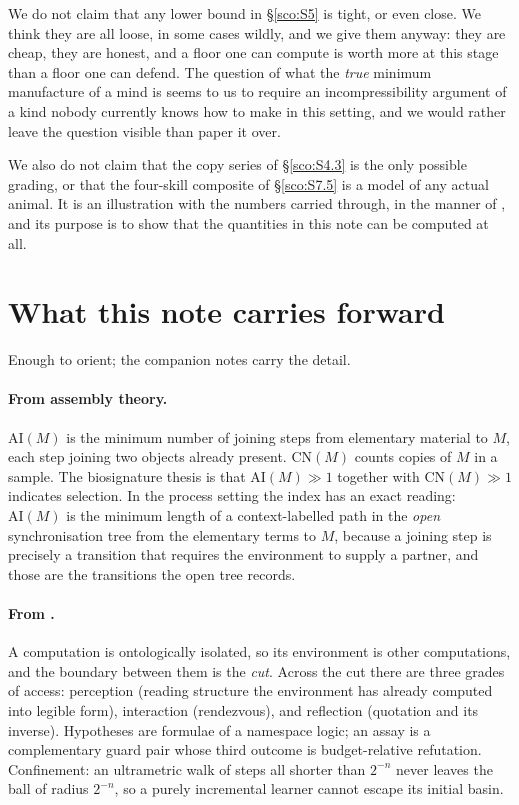 \documentclass[11pt]{article}
\theoremstyle{plain}
\theoremstyle{definition}
\theoremstyle{remark}
\newcommand{\AI}{\mathrm{AI}}
\newcommand{\CN}{\mathrm{CN}}
\begin{document}
We do not claim that any lower bound in \S\ref{sco:S5} is tight, or even
close. We think they are all loose, in some cases wildly, and we give
them anyway: they are cheap, they are honest, and a floor one can compute
is worth more at this stage than a floor one can defend. The question of
what the \emph{true} minimum manufacture of a mind is seems to us to
require an incompressibility argument of a kind nobody currently knows how
to make in this setting, and we would rather leave the question visible
than paper it over.

We also do not claim that the copy series of \S\ref{sco:S4.3} is the only
possible grading, or that the four-skill composite of \S\ref{sco:S7.5} is
a model of any actual animal. It is an illustration with the numbers
carried through, in the manner of \cite[\S12]{compose}, and its purpose is
to show that the quantities in this note can be computed at all.

\section{What this note carries forward}\label{sco:S2}

Enough to orient; the companion notes carry the detail.

\paragraph{From assembly theory.}
$\AI(M)$ is the minimum number of joining steps from elementary material to
$M$, each step joining two objects already present. $\CN(M)$ counts copies
of $M$ in a sample. The biosignature thesis is that
$\AI(M) \gg 1$ together with $\CN(M) \gg 1$ indicates selection. In the
process setting the index has an exact reading: $\AI(M)$ is the minimum
length of a context-labelled path in the \emph{open} synchronisation tree
from the elementary terms to $M$, because a joining step is precisely a
transition that requires the environment to supply a partner, and those
are the transitions the open tree records.

\paragraph{From \cite{scientist}.}
A computation is ontologically isolated, so its environment is other
computations, and the boundary between them is the \emph{cut}. Across the
cut there are three grades of access: perception (reading structure the
environment has already computed into legible form), interaction
(rendezvous), and reflection (quotation and its inverse). Hypotheses are
formulae of a namespace logic; an assay is a complementary guard pair
whose third outcome is budget-relative refutation. Confinement: an
ultrametric walk of steps all shorter than $2^{-n}$ never leaves the ball
of radius $2^{-n}$, so a purely incremental learner cannot escape its
initial basin.
\end{document}
